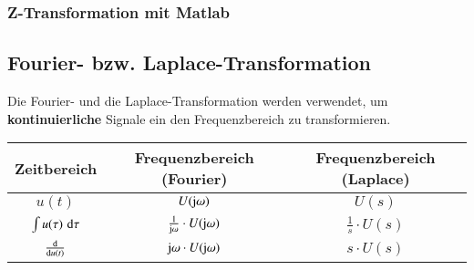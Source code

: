 \subsubsection{Z-Transformation mit Matlab}




\subsection{Fourier- bzw. Laplace-Transformation}

Die Fourier- und die Laplace-Transformation werden verwendet, um \textbf{kontinuierliche} Signale ein den Frequenzbereich zu transformieren.

\begin{center}
    \begin{tabular}{c c c}
        \toprule
        \textbf{Zeitbereich}            & \textbf{Frequenzbereich (Fourier)}                & \textbf{Frequenzbereich (Laplace)}    \\
        \toprule
        \strut$u(t)$                          & $U(\mathrm{j} \omega)$                                 & $U(s)$                                \\
        \strut$\int u(\tau) \, \mathop{} \! \mathrm{d} \tau$    & $\frac{1}{\mathrm{j} \omega} \cdot U(\mathrm{j} \omega)$    & $\frac{1}{s} \cdot U(s)$              \\
        \strut$\frac{\mathop{} \! \mathrm{d}}{\mathop{} \! \mathrm{d} u(t)}$      & $\mathrm{j} \omega \cdot U(\mathrm{j} \omega)$              & $s \cdot U(s)$\\
        \bottomrule
    \end{tabular}
\end{center}
\renewcommand{\arraystretch}{1}

